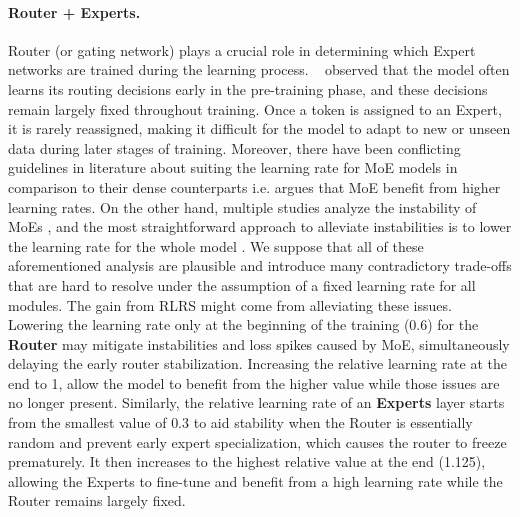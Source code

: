 \documentclass{article}
\theoremstyle{plain}
\theoremstyle{definition}
\theoremstyle{remark}
\begin{document}
    \paragraph{Router + Experts.} Router (or gating network) plays a crucial role in determining which Expert networks are trained during the learning process. ~\citet{xue2024openmoe} observed that the model often learns its routing decisions early in the pre-training phase, and these decisions remain largely fixed throughout training. Once a token is assigned to an Expert, it is rarely reassigned, making it difficult for the model to adapt to new or unseen data during later stages of training. Moreover, there have been conflicting guidelines in literature about suiting the learning rate for MoE models in comparison to their dense counterparts i.e. \citep{zoph2022st} argues that MoE benefit from higher learning rates. On the other hand, multiple studies analyze the instability of MoEs \citep{fedus2022switch}, and the most straightforward approach to alleviate instabilities is to lower the learning rate for the whole model \citep{wortsman2023small}. We suppose that all of these aforementioned analysis are plausible and introduce many contradictory trade-offs that are hard to resolve under the assumption of a fixed learning rate for all modules. The gain from RLRS might come from alleviating these issues. Lowering the learning rate only at the beginning of the training (0.6) for the \textbf{Router} may mitigate instabilities and loss spikes caused by MoE, simultaneously delaying the early router stabilization. Increasing the relative learning rate at the end to 1, allow the model to benefit from the higher value while those issues are no longer present. Similarly, the relative learning rate of an \textbf{Experts} layer starts from the smallest value of $0.3$ to aid stability when the Router is essentially random and prevent early expert specialization, which causes the router to freeze prematurely. It then increases to the highest relative value at the end (1.125), allowing the Experts to fine-tune and benefit from a high learning rate while the Router remains largely fixed.
    
\end{document}
